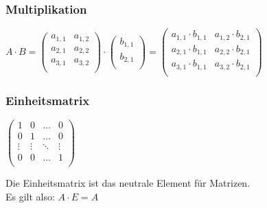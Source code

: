 \begin{framed} [Rechenregeln]
    \subsubsection*{Multiplikation}
      \begin{center}
        $A \cdot B = 
        \begin{pmatrix}
          a_{1,1} & a_{1,2} \\
          a_{2,1} & a_{2,2} \\
          a_{3,1} & a_{3,2} \\
        \end{pmatrix}
        \cdot
        \begin{pmatrix}
          b_{1,1} \\
          b_{2,1} \\
        \end{pmatrix}
        =
        \begin{pmatrix}
          a_{1,1} \cdot b_{1,1} & a_{1,2} \cdot b_{2,1} \\
          a_{2,1} \cdot b_{1,1} & a_{2,2} \cdot b_{2,1} \\
          a_{3,1} \cdot b_{1,1} & a_{3,2} \cdot b_{2,1} \\
        \end{pmatrix}$
      \end{center}
 
    \subsubsection*{Einheitsmatrix}
      \begin{center}
        $\begin{pmatrix}
          1       & 0       & \dots   & 0       \\
          0       & 1       & \dots   & 0       \\
          \vdots  & \vdots  & \ddots  & \vdots  \\
          0       & 0       & \dots   & 1       \\ 
        \end{pmatrix}$
      \end{center}
      Die Einheitsmatrix ist das neutrale Element für Matrizen.\\
      Es gilt also: $A \cdot E = A$


\end{framed}
